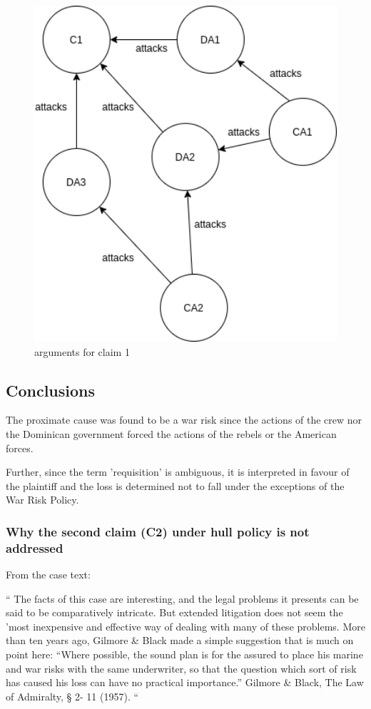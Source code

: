 \begin{figure}[t]
  \centering
  \includegraphics[width=5in]{figures/arguments_claim_1.png}
  \caption[Arguments for claim 1]{\small arguments for claim 1}
  \label{fig:monitoring-test}
\end{figure}
    

\subsection{Conclusions}

The proximate cause was found to be a war risk since the actions of the crew nor the Dominican government forced the actions of the rebels or the American forces.

Further, since the term 'requisition' is ambiguous, it is interpreted in favour of the plaintiff and the loss is determined not to fall under the exceptions of the War Risk Policy. 

\subsubsection{Why the second claim (C2) under hull policy is not addressed}

From the case text:

``
The facts of this case are interesting, and the legal problems it presents can be said
to be comparatively intricate. But extended litigation does not seem the 'most
inexpensive and effective way of dealing with many of these problems. More than
ten years ago, Gilmore & Black made a simple suggestion that is much on point here:
“Where possible, the sound plan is for the assured to place his marine and war risks
with the same underwriter, so that the question which sort of risk has caused his
loss can have no practical importance.” Gilmore & Black, The Law of Admiralty, § 2-
11 (1957).
``



\FloatBarrier
